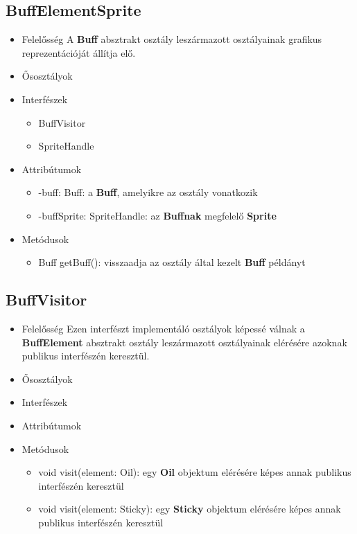 \subsection{BuffElementSprite}
\begin{itemize}
\item Felelősség \newline
    A \textbf{Buff} absztrakt osztály leszármazott osztályainak grafikus reprezentációját állítja elő.
\item Ősosztályok
\item Interfészek
    \begin{itemize}
        \item BuffVisitor
        \item SpriteHandle
    \end{itemize}
\item Attribútumok
    \begin{itemize}
        \item -buff: Buff: a \textbf{Buff}, amelyikre az osztály vonatkozik
        \item -buffSprite: SpriteHandle: az \textbf{Buffnak} megfelelő \textbf{Sprite}
    \end{itemize}
\item Metódusok
	\begin{itemize}
        \item Buff getBuff(): visszaadja az osztály által kezelt \textbf{Buff} példányt
	\end{itemize}
\end{itemize}

\subsection{BuffVisitor}
\begin{itemize}
\item Felelősség \newline
    Ezen interfészt implementáló osztályok képessé válnak a \textbf{BuffElement} absztrakt osztály leszármazott osztályainak elérésére azoknak publikus interfészén keresztül.
\item Ősosztályok
\item Interfészek
\item Attribútumok
\item Metódusok
	\begin{itemize}
        \item void visit(element: Oil): egy \textbf{Oil} objektum elérésére képes annak publikus interfészén keresztül
        \item void visit(element: Sticky): egy \textbf{Sticky} objektum elérésére képes annak publikus interfészén keresztül
	\end{itemize}
\end{itemize}

